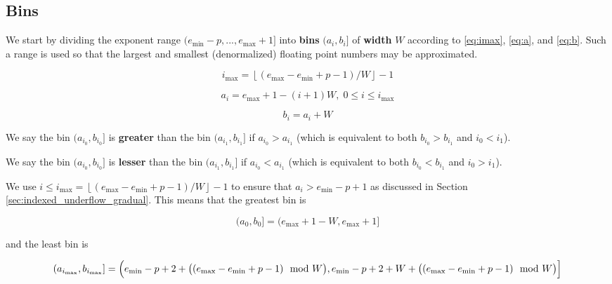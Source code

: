 \documentclass[12pt]{article}
\providecommand{\floor}[1]{\left \lfloor #1 \right \rfloor }
\providecommand{\min}{\ensuremath{\text{min}}}
\providecommand{\max}{\ensuremath{\text{max}}}
\theoremstyle{definition}
\numberwithin{equation}{section}
\numberwithin{figure}{section}
\begin{document}
  \subsection{Bins}
    \label{sec:binning_bins}
    We start by dividing the exponent range $(e_{\min} - p, ..., e_{\max} + 1]$  into \textbf{bins} $(a_i, b_i]$ of \textbf{width} $W$ according to \eqref{eq:imax}, \eqref{eq:a}, and \eqref{eq:b}. Such a range is used so that the largest and smallest (denormalized) floating point numbers may be approximated.

    \begin{equation}
      i_{\max} = \floor{(e_{\max} - e_{\min} + p - 1)/W} - 1
      \label{eq:imax}
    \end{equation}

    \begin{equation}
      a_i = e_{\max} + 1 - (i + 1)W,\; 0 \leq i \leq i_{\max}
      \label{eq:a}
    \end{equation}

    \begin{equation}
      b_i = a_i + W
      \label{eq:b}
    \end{equation}

    We say the bin $(a_{i_0}, b_{i_0}]$ is \textbf{greater} than the bin $(a_{i_1}, b_{i_1}]$ if $a_{i_0} > a_{i_1}$ (which is equivalent to both $b_{i_0} > b_{i_1}$ and $i_0 < i_1$).

    We say the bin $(a_{i_0}, b_{i_0}]$ is \textbf{lesser} than the bin $(a_{i_1}, b_{i_1}]$ if $a_{i_0} < a_{i_1}$ (which is equivalent to both $b_{i_0} < b_{i_1}$ and $i_0 > i_1$).

    We use $i \leq i_{\max} = \floor{(e_{\max} - e_{\min} + p - 1)/W} - 1$ to ensure that $a_i > e_{\min} - p + 1$ as discussed in Section \ref{sec:indexed_underflow_gradual}. This means that the greatest bin is

    \begin{equation}
      (a_{0}, b_{0}] = (e_{\max} + 1 - W, e_{\max} + 1]
      \label{eq:binmax}
    \end{equation}

    and the least bin is

    \begin{equation}
      (a_{i_{\max}}, b_{i_{\max}}] = \Bigl(e_{\min} - p + 2 + \bigl((e_{\max} - e_{\min} + p - 1)\mod W\bigr),
      e_{\min} - p + 2 + W + \bigl((e_{\max} - e_{\min} + p - 1)\mod W\bigr)\Bigr]
      \label{eq:binmin}
    \end{equation}
\end{document}
